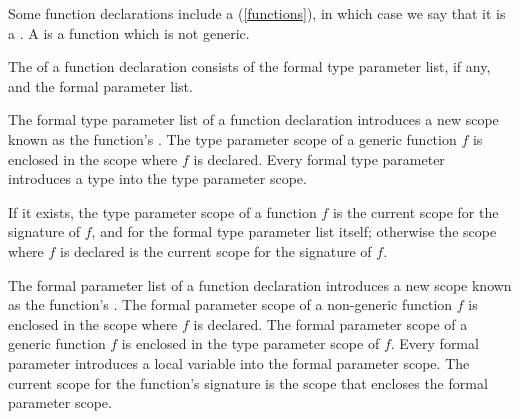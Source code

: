 \documentclass[makeidx]{article}
\begin{document}
\LMHash{}%
Some function declarations include a
 (\ref{functions}),
in which case we say that it is a
.
A 
is a function which is not generic.

\LMHash{}%
The  of a function declaration consists of the formal type parameter list, if any, and the formal parameter list.


\LMHash{}%
The formal type parameter list of a function declaration introduces
a new scope known as the function's
.
The type parameter scope of a generic function $f$ is enclosed in the scope where $f$ is declared.
Every formal type parameter introduces a type into the type parameter scope.

\LMHash{}%
If it exists, the type parameter scope of a function $f$ is the current scope for the signature of $f$, and for the formal type parameter list itself;
otherwise the scope where $f$ is declared is the current scope for the signature of $f$.


\LMHash{}%
The formal parameter list of a function declaration introduces a new scope known as the function's
.
The formal parameter scope of a non-generic function $f$ is enclosed in the scope where $f$ is declared.
The formal parameter scope of a generic function $f$ is enclosed in the type parameter scope of $f$.
Every formal parameter introduces a local variable into the formal parameter scope.
The current scope for the function's signature is the scope that encloses the formal parameter scope.

\end{document}
